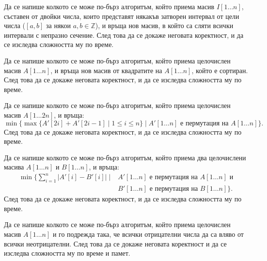 \begin{problem}
Да се напише колкото се може по-бърз алгоритъм, който приема масив $I[1 \dots n]$, съставен от двойки числа, които представят някакъв затворен интервал от цели числа ($[a, b]$ за някои $a, b \in \mathbb{Z}$), и връща нов масив, в който са сляти всички интервали с непразно сечение.
След това да се докаже неговата коректност, и да се изследва сложността му по време.
\end{problem}

\begin{problem}
Да се напише колкото се може по-бърз алгоритъм, който приема целочислен масив $A[1 \dots n]$, и връща нов масив от квадратите на $A[1 \dots n]$, който е сортиран.
След това да се докаже неговата коректност, и да се изследва сложността му по време.
\end{problem}

\begin{problem}
Да се напише колкото се може по-бърз алгоритъм, който приема целочислен масив $A[1 \dots 2n]$, и връща:
\[
    \min\{ \max \{ A'[2i] + A'[2i - 1] \mid 1 \leq i \leq n \} \mid A'[1 \dots n] \text{ е пермутация на } A[1 \dots n] \}.
\]
След това да се докаже неговата коректност, и да се изследва сложността му по време.
\end{problem}

\begin{problem}
Да се напише колкото се може по-бърз алгоритъм, който приема два целочислени масива $A[1 \dots n]$ и $B[1 \dots n]$, и връща:
\begin{align*}
    \min \{ \sum\limits_{i = 1}^n |A'[i] - B'[i]| \mid & A'[1 \dots n] \text{ е пермутация на } A[1 \dots n] \text{ и} \\
                                                       & B'[1 \dots n] \text{ е пермутация на } B[1 \dots n] \}.
\end{align*}
След това да се докаже неговата коректност, и да се изследва сложността му по време.
\end{problem}

\begin{problem}
Да се напише колкото се може по-бърз алгоритъм, който приема целочислен масив $A[1 \dots n]$ и го подрежда така, че всички отрицателни числа да са вляво от всички неотрицателни.
След това да се докаже неговата коректност и да се изследва сложността му по време и памет.
\end{problem}